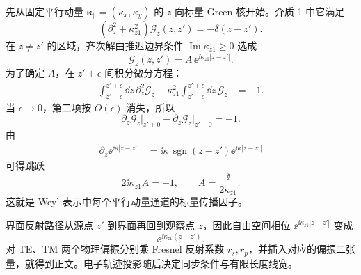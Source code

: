 \begin{derivation}[平面界面的混合表象与单位长度损失]
先从固定平行动量 $\boldsymbol\kappa_\parallel=(\kappa_x,\kappa_y)$ 的 $z$ 向标量 Green 核开始。介质 1 中它满足
\begin{equation*}
 (\partial_z^2+\kappa_{z1}^2)\mathscr G_z(z,z')
 =-\delta(z-z').
\end{equation*}
在 $z\neq z'$ 的区域，齐次解由推迟边界条件 $\operatorname{Im}\kappa_{z1}\ge0$ 选成
\begin{equation*}
 \mathscr G_z(z,z')
 =A\,\ee^{\ii\kappa_{z1}|z-z'|}.
\end{equation*}
为了确定 $A$，在 $z'\pm\epsilon$ 间积分微分方程：
\begin{align*}
 \int_{z'-\epsilon}^{z'+\epsilon}\dd z\,
 \partial_z^2\mathscr G_z
 +\kappa_{z1}^2
 \int_{z'-\epsilon}^{z'+\epsilon}\dd z\,\mathscr G_z
 &=-1.
\end{align*}
当 $\epsilon\to0$，第二项按 $O(\epsilon)$ 消失，所以
\begin{equation*}
 \partial_z\mathscr G_z\big|_{z'+0}
 -\partial_z\mathscr G_z\big|_{z'-0}=-1.
\end{equation*}
由
\begin{align*}
 \partial_z \ee^{\ii\kappa|z-z'|}
 &=\ii\kappa\,\operatorname{sgn}(z-z')
 \ee^{\ii\kappa|z-z'|}
\end{align*}
可得跳跃
\begin{equation*}
 2\ii\kappa_{z1}A=-1,
 \qquad
 A=\frac{\ii}{2\kappa_{z1}}.
\end{equation*}
这就是 Weyl 表示中每个平行动量通道的标量传播因子。

界面反射路径从源点 $z'$ 到界面再回到观察点 $z$，因此自由空间相位 $\ee^{\ii\kappa_{z1}|z-z'|}$ 变成
\begin{equation*}
 \ee^{\ii\kappa_{z1}(z+z')}.
\end{equation*}
对 TE、TM 两个物理偏振分别乘 Fresnel 反射系数 $r_s,r_p$，并插入对应的偏振二张量，就得到正文。电子轨迹投影随后决定同步条件与有限长度线宽。


\end{derivation}
